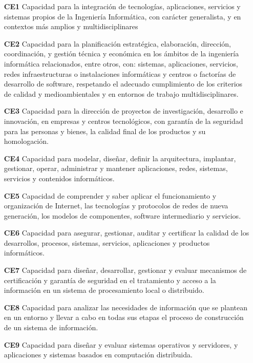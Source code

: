 \begin{itemize}
\item[\textbf{CE1}] Capacidad para la integración de tecnologías, aplicaciones, servicios
  y sistemas propios de la Ingeniería Informática, con carácter generalista, y
  en contextos más
amplios y multidisciplinares
\item[\textbf{CE2}] Capacidad para la planificación estratégica, elaboración, dirección,
coordinación,
y gestión técnica y económica en los ámbitos de la ingeniería informática
relacionados, entre otros, con: sistemas, aplicaciones, servicios, redes 
infraestructuras o instalaciones informáticas y centros o factorías de
desarrollo de
software, respetando el adecuado cumplimiento de los criterios de calidad y
medioambientales y en entornos de trabajo multidisciplinares.
\item[\textbf{CE3}] Capacidad para la dirección de proyectos de investigación,
  desarrollo e innovación, en empresas y centros tecnológicos, con garantía de
  la seguridad para
las personas y bienes, la calidad final de los productos y su homologación. 
\item [\textbf{CE4}] Capacidad para modelar, diseñar, definir la arquitectura, implantar,
gestionar,
operar, administrar y mantener aplicaciones, redes, sistemas, servicios y
contenidos informáticos.

\item[\textbf{CE5}] Capacidad de comprender y saber aplicar el funcionamiento y organización
de
Internet, las tecnologías y protocolos de redes de nueva generación, los modelos
de componentes, software intermediario y servicios.

\item[\textbf{CE6}] Capacidad para asegurar, gestionar, auditar y certificar la calidad de los
desarrollos, procesos, sistemas, servicios, aplicaciones y productos
informáticos.

\item[\textbf{CE7}] Capacidad para diseñar, desarrollar, gestionar y evaluar mecanismos de
certificación y garantía de seguridad en el tratamiento y acceso a la
información
en un sistema de procesamiento local o distribuido.

\item[\textbf{CE8}] Capacidad para analizar las necesidades de información que se plantean en
un
entorno y llevar a cabo en todas sus etapas el proceso de construcción de un
sistema de información.

\item[\textbf{CE9}] Capacidad para diseñar y evaluar sistemas operativos y servidores, y
aplicaciones
y sistemas basados en computación distribuida.


\end{itemize}
